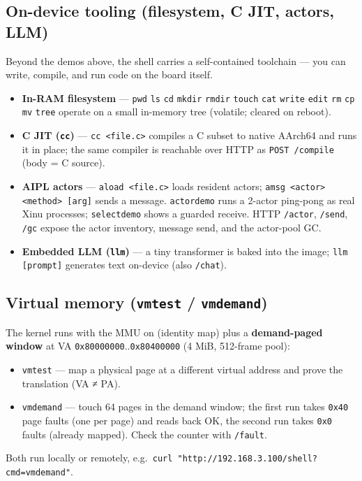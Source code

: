 \documentclass[a4paper,11pt]{article}
\begin{document}
\subsection{On-device tooling (filesystem, C JIT, actors, LLM)}
Beyond the demos above, the shell carries a self-contained toolchain --- you can
write, compile, and run code on the board itself.
\begin{itemize}[leftmargin=1.4em,itemsep=1pt]
\item \textbf{In-RAM filesystem} --- \verb|pwd| \verb|ls| \verb|cd| \verb|mkdir|
  \verb|rmdir| \verb|touch| \verb|cat| \verb|write| \verb|edit| \verb|rm|
  \verb|cp| \verb|mv| \verb|tree| operate on a small in-memory tree (volatile;
  cleared on reboot).
\item \textbf{C JIT (\texttt{cc})} --- \verb|cc <file.c>| compiles a C subset to
  native AArch64 and runs it in place; the same compiler is reachable over HTTP
  as \verb|POST /compile| (body = C source).
\item \textbf{AIPL actors} --- \verb|aload <file.c>| loads resident actors;
  \verb|amsg <actor> <method> [arg]| sends a message. \verb|actordemo| runs a
  2-actor ping-pong as real Xinu processes; \verb|selectdemo| shows a guarded
  receive. HTTP \verb|/actor|, \verb|/send|, \verb|/gc| expose the actor
  inventory, message send, and the actor-pool GC.
\item \textbf{Embedded LLM (\texttt{llm})} --- a tiny transformer is baked into
  the image; \verb|llm [prompt]| generates text on-device (also \verb|/chat|).
\end{itemize}

\subsection{Virtual memory (\texttt{vmtest} / \texttt{vmdemand})}
The kernel runs with the MMU on (identity map) plus a \textbf{demand-paged
window} at VA \verb|0x80000000|..\verb|0x80400000| (4 MiB, 512-frame pool):
\begin{itemize}[leftmargin=1.4em,itemsep=1pt]
\item \verb|vmtest| --- map a physical page at a different virtual address and
  prove the translation (VA ≠ PA).
\item \verb|vmdemand| --- touch 64 pages in the demand window; the first run
  takes \verb|0x40| page faults (one per page) and reads back OK, the second run
  takes \verb|0x0| faults (already mapped). Check the counter with \verb|/fault|.
\end{itemize}
Both run locally or remotely, e.g.\
\verb|curl "http://192.168.3.100/shell?cmd=vmdemand"|.
\end{document}
